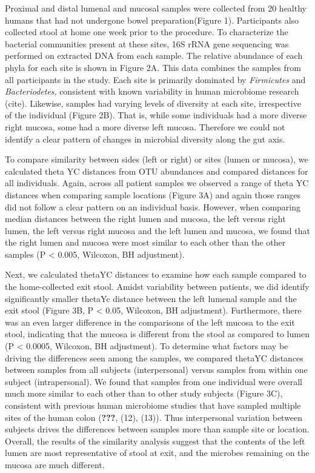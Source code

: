 \documentclass[11pt,]{article}
\begin{document}
Proximal and distal lumenal and mucosal samples were collected from 20
healthy humans that had not undergone bowel preparation(Figure 1).
Participants also collected stool at home one week prior to the
procedure. To characterize the bacterial communities present at these
sites, 16S rRNA gene sequencing was performed on extracted DNA from each
sample. The relative abundance of each phyla for each site is shown in
Figure 2A. This data combines the samples from all participants in the
study. Each site is primarily dominated by \emph{Firmicutes} and
\emph{Bacteriodetes}, consistent with known variability in human
microbiome research (cite). Likewise, samples had varying levels of
diversity at each site, irrespective of the individual (Figure 2B). That
is, while some individuals had a more diverse right mucosa, some had a
more diverse left mucosa. Therefore we could not identify a clear
pattern of changes in microbial diversity along the gut axis.

To compare similarity between sides (left or right) or sites (lumen or
mucosa), we calculated theta YC distances from OTU abundances and
compared distances for all individuals. Again, across all patient
samples we observed a range of theta YC distances when comparing sample
locations (Figure 3A) and again those ranges did not follow a clear
pattern on an individual basis. However, when comparing median distances
between the right lumen and mucosa, the left versus right lumen, the
left versus right mucosa and the left lumen and mucosa, we found that
the right lumen and mucosa were most similar to each other than the
other samples (P \textless{} 0.005, Wilcoxon, BH adjustment).

Next, we calculated thetaYC distances to examine how each sample
compared to the home-collected exit stool. Amidst variability between
patients, we did identify significantly smaller thetaYc distance between
the left lumenal sample and the exit stool (Figure 3B, P \textless{}
0.05, Wilcoxon, BH adjustment). Furthermore, there was an even larger
difference in the comparisons of the left mucosa to the exit stool,
indicating that the mucosa is different from the stool as compared to
lumen (P \textless{} 0.0005, Wilcoxon, BH adjustment). To determine what
factors may be driving the differences seen among the samples, we
compared thetaYC distances between samples from all subjects
(interpersonal) versus samples from within one subject (intrapersonal).
We found that samples from one individual were overall much more similar
to each other than to other study subjects (Figure 3C), consistent with
previous human microbiome studies that have sampled multiple sites of
the human colon (\textbf{???}, (12), (13)). Thus interpersonal variation
between subjects drives the differences between samples more than sample
site or location. Overall, the results of the similarity analysis
suggest that the contents of the left lumen are most representative of
stool at exit, and the microbes remaining on the mucosa are much
different.
\end{document}
